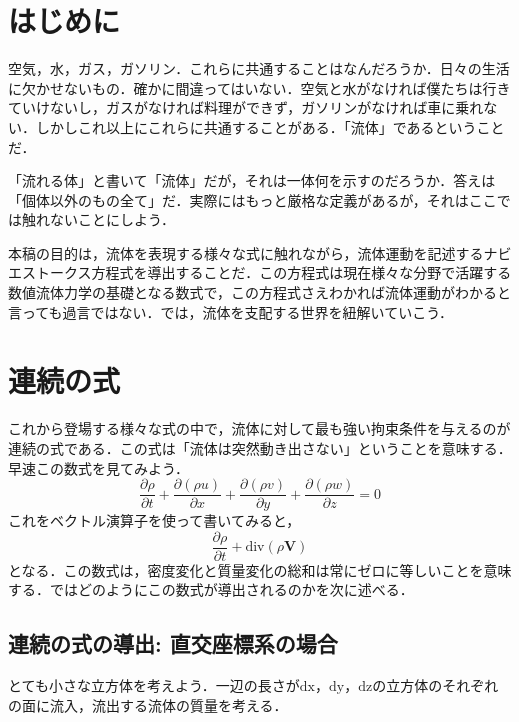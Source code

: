 \documentclass{jsarticle}
\newcommand{\pfrac}[2]{\frac{\partial{}{#1}}{\partial{}{#2}}}
\begin{document}
\section{はじめに}
空気，水，ガス，ガソリン．これらに共通することはなんだろうか．日々の生活に欠かせないもの．確かに間違ってはいない．空気と水がなければ僕たちは行きていけないし，ガスがなければ料理ができず，ガソリンがなければ車に乗れない．しかしこれ以上にこれらに共通することがある．「流体」であるということだ．

「流れる体」と書いて「流体」だが，それは一体何を示すのだろうか．答えは「個体以外のもの全て」だ．実際にはもっと厳格な定義があるが，それはここでは触れないことにしよう．

本稿の目的は，流体を表現する様々な式に触れながら，流体運動を記述するナビエストークス方程式を導出することだ．この方程式は現在様々な分野で活躍する数値流体力学の基礎となる数式で，この方程式さえわかれば流体運動がわかると言っても過言ではない．では，流体を支配する世界を紐解いていこう．

\section{連続の式}
これから登場する様々な式の中で，流体に対して最も強い拘束条件を与えるのが連続の式である．この式は「流体は突然動き出さない」ということを意味する．早速この数式を見てみよう．
\begin{equation}
  \pfrac{\rho}{t}+\pfrac{(\rho{}u)}{x}+\pfrac{(\rho{}v)}{y}+\pfrac{(\rho{}w)}{z}=0
\end{equation}
これをベクトル演算子を使って書いてみると，
\begin{equation}
  \pfrac{\rho}{t}+\mathrm{div}(\rho\bm{V})
\end{equation}
となる．この数式は，密度変化と質量変化の総和は常にゼロに等しいことを意味する．ではどのようにこの数式が導出されるのかを次に述べる．
\subsection{連続の式の導出: 直交座標系の場合}
とても小さな立方体を考えよう．一辺の長さが$\mathrm{dx}$，$\mathrm{dy}$，$\mathrm{dz}$の立方体のそれぞれの面に流入，流出する流体の質量を考える．
\end{document}
